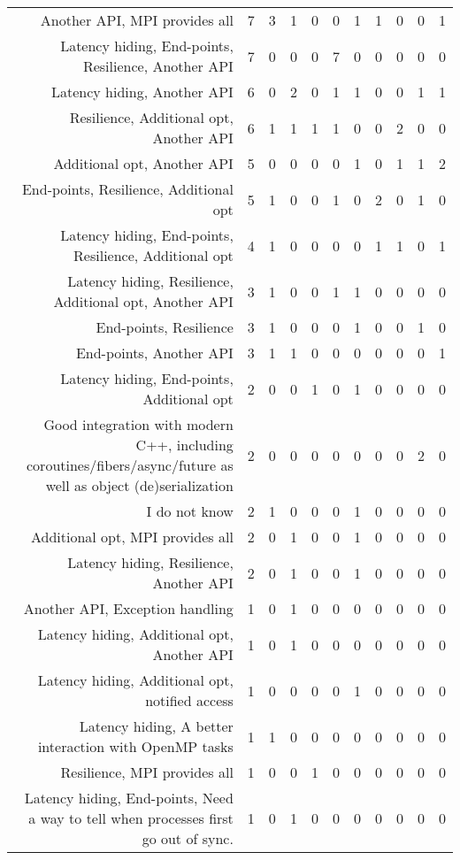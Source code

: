 {\begin{landscape}
\begin{longtable}[htb]{r|c|c|c|c|c|c|c|c|c|c}
{Another API, MPI provides all} & 7 & 3 & 1 & 0 & 0 & 1 & 1 & 0 & 0 & 1 \\%
{Latency hiding, End-points, Resilience, Another API} & 7 & 0 & 0 & 0 & 7 & 0 & 0 & 0 & 0 & 0 \\%
{Latency hiding, Another API} & 6 & 0 & 2 & 0 & 1 & 1 & 0 & 0 & 1 & 1 \\%
{Resilience, Additional opt, Another API} & 6 & 1 & 1 & 1 & 1 & 0 & 0 & 2 & 0 & 0 \\%
{Additional opt, Another API} & 5 & 0 & 0 & 0 & 0 & 1 & 0 & 1 & 1 & 2 \\%
{End-points, Resilience, Additional opt} & 5 & 1 & 0 & 0 & 1 & 0 & 2 & 0 & 1 & 0 \\%
{Latency hiding, End-points, Resilience, Additional opt} & 4 & 1 & 0 & 0 & 0 & 0 & 1 & 1 & 0 & 1 \\%
{Latency hiding, Resilience, Additional opt, Another API} & 3 & 1 & 0 & 0 & 1 & 1 & 0 & 0 & 0 & 0 \\%
{End-points, Resilience} & 3 & 1 & 0 & 0 & 0 & 1 & 0 & 0 & 1 & 0 \\%
{End-points, Another API} & 3 & 1 & 1 & 0 & 0 & 0 & 0 & 0 & 0 & 1 \\%
{Latency hiding, End-points, Additional opt} & 2 & 0 & 0 & 1 & 0 & 1 & 0 & 0 & 0 & 0 \\%
{Good integration with modern C++, including coroutines/fibers/async/future as well as object (de)serialization} & 2 & 0 & 0 & 0 & 0 & 0 & 0 & 0 & 2 & 0 \\%
{I do not know} & 2 & 1 & 0 & 0 & 0 & 1 & 0 & 0 & 0 & 0 \\%
{Additional opt, MPI provides all} & 2 & 0 & 1 & 0 & 0 & 1 & 0 & 0 & 0 & 0 \\%
{Latency hiding, Resilience, Another API} & 2 & 0 & 1 & 0 & 0 & 1 & 0 & 0 & 0 & 0 \\%
{Another API, Exception handling} & 1 & 0 & 1 & 0 & 0 & 0 & 0 & 0 & 0 & 0 \\%
{Latency hiding, Additional opt, Another API} & 1 & 0 & 1 & 0 & 0 & 0 & 0 & 0 & 0 & 0 \\%
{Latency hiding, Additional opt, notified access} & 1 & 0 & 0 & 0 & 0 & 1 & 0 & 0 & 0 & 0 \\%
{Latency hiding, A better interaction with OpenMP tasks} & 1 & 1 & 0 & 0 & 0 & 0 & 0 & 0 & 0 & 0 \\%
{Resilience, MPI provides all} & 1 & 0 & 0 & 1 & 0 & 0 & 0 & 0 & 0 & 0 \\%
{Latency hiding, End-points, Need a way to tell when processes first go out of sync.} & 1 & 0 & 1 & 0 & 0 & 0 & 0 & 0 & 0 & 0 \\%

\end{longtable}
\end{landscape}}
